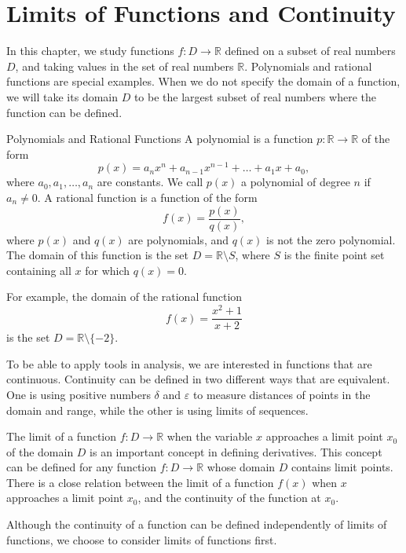  

 
 

\chapter{Limits of   Functions and Continuity}\label{ch2}

 In this chapter, we study functions $f:D\rightarrow \mathbb{R}$ defined on a subset of real numbers $D$, and taking values in the set of real numbers $\mathbb{R}$. 
 Polynomials and rational functions are special examples.  When we do not specify the domain of a function, we will take its domain $D$ to be the largest subset of real numbers where the function can be defined.
 
 \begin{definition}{Polynomials and Rational Functions}
 A polynomial is a function $p:\mathbb{R}\rightarrow\mathbb{R}$ of the form
 \[p(x)=a_nx^n+a_{n-1}x^{n-1}+\ldots+a_1x+a_0,\]
 where $a_0, a_1, \ldots, a_n$ are constants. We call $p(x)$ a polynomial of degree $n$ if $a_n\neq 0$. 
 A rational function is a function of the form 
 \[f(x)=\frac{p(x)}{q(x)},\]
 where $p(x)$ and $q(x)$ are polynomials, and $q(x)$ is not the zero polynomial. The domain of this function is the set $D=\mathbb{R}\setminus S$, where $S$ is the finite point set containing all $x$ for which $q(x)=0$.
 \end{definition}
 
 For example, the domain of the rational function \[ f(x)=\frac{x^2+1}{x+2}\] is the set $D=\mathbb{R}\setminus\{-2\}$.
 
 
 To be able to apply tools in analysis, we are   interested in functions that are continuous. 
 Continuity can be defined in two different  ways that are equivalent. One is using positive numbers $\delta$ and $\varepsilon$ to measure distances of points in the domain and range, while the other is using limits of sequences. 
 
 The limit of a function $f:D\rightarrow \mathbb{R}$ when the variable $x$ approaches a limit point $x_0$ of the domain $D$ is an important concept in defining derivatives.  This concept can be defined for any function $f:D\rightarrow \mathbb{R}$ whose domain $D$ contains limit points. 
 There is a close relation between the limit of a function $f(x)$ when $x$ approaches a limit point $x_0$, and the continuity of the function at $x_0$. 
 
 Although the continuity of a function can be defined independently of limits of functions, we choose to consider limits of functions first. 
 
